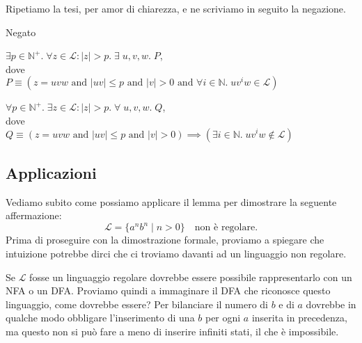 \documentclass[class=book, crop=false, oneside, 12pt]{standalone}
\begin{document}
Ripetiamo la tesi, per amor di chiarezza, e ne scriviamo in seguito la negazione.
\begin{labeling}{Negato}
    \item[Tesi] 
    \(\exists p \in \mathbb{N}^+ . \;\forall z \in \mathcal{L}:|z|>p . \; \exists \;u, v, w . \; P\), \\ 
    dove \\
    \(P \equiv (z = uvw \textrm{ and } |uv| \le p \textrm{ and } |v| > 0 \textrm{ and } \forall i \in \mathbb{N} . \; uv^iw \in \mathcal{L}) \)
    \item[Negato]
    \(\forall p \in \mathbb{N}^+ . \;\exists z \in \mathcal{L}:|z|>p . \; \forall \;u, v, w . \; Q\), \\
    dove \\
    \(Q \equiv (z = uvw \textrm{ and } |uv| \le p \textrm{ and } |v| > 0) \implies (\exists i \in \mathbb{N} . \; uv^iw \notin \mathcal{L}) \) 
\end{labeling}

\subsection{Applicazioni}
Vediamo subito come possiamo applicare il lemma per dimostrare la seguente affermazione:
\begin{equation}
    \mathcal{L} = \{a^n b^n \mid n>0\} \quad \textrm{non è regolare.}
    \label{pl_regular_languages_ex_1}
\end{equation}
Prima di proseguire con la dimostrazione formale, proviamo a spiegare che intuizione potrebbe dirci che ci troviamo davanti ad un linguaggio non regolare.

Se \(\mathcal{L}\) fosse un linguaggio regolare dovrebbe essere possibile rappresentarlo con un NFA o un DFA. Proviamo quindi a immaginare il DFA che riconosce questo linguaggio, come dovrebbe essere? Per bilanciare il numero di \(b\) e di \(a\) dovrebbe in qualche modo obbligare l'inserimento di una \(b\) per ogni \(a\) inserita in precedenza, ma questo non si può fare a meno di inserire infiniti stati, il che è impossibile.
\end{document}
